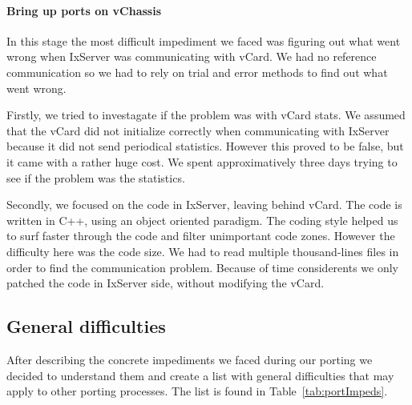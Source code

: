 \paragraph{Bring up ports on vChassis}

In this stage the most difficult impediment we faced was figuring out what went
wrong when IxServer was communicating with vCard. We had no reference
communication so we had to rely on trial and error methods to find out what went
wrong.

Firstly, we tried to investagate if the problem was with vCard stats. We assumed
that the vCard did not initialize correctly when communicating with IxServer
because it did not send periodical statistics. However this proved to be false,
but it came with a rather huge cost. We spent approximatively three days trying
to see if the problem was the statistics.

Secondly, we focused on the code in IxServer, leaving behind vCard. The code is
written in C++, using an object oriented paradigm. The coding style helped us
to surf faster through the code and filter unimportant code zones. However the
difficulty here was the code size. We had to read multiple thousand-lines files
in order to find the communication problem. Because of time considerents we
only patched the code in IxServer side, without modifying the vCard.

\subsection{General difficulties}

After describing the concrete impediments we faced during our porting we decided
to understand them and create a list with general difficulties that may apply
to other porting processes. The list is found in Table~\ref{tab:portImpeds}.

